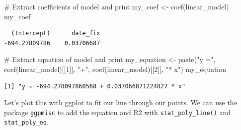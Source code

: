 \documentclass[
  letterpaper,
  DIV=11,
  numbers=noendperiod]{scrreprt}
\newenvironment{Shaded}{\begin{snugshade}}{\end{snugshade}}
\newcommand{\CommentTok}[1]{\textcolor[rgb]{0.37,0.37,0.37}{#1}}
\newcommand{\DecValTok}[1]{\textcolor[rgb]{0.68,0.00,0.00}{#1}}
\newcommand{\FunctionTok}[1]{\textcolor[rgb]{0.28,0.35,0.67}{#1}}
\newcommand{\NormalTok}[1]{\textcolor[rgb]{0.00,0.23,0.31}{#1}}
\newcommand{\OtherTok}[1]{\textcolor[rgb]{0.00,0.23,0.31}{#1}}
\newcommand{\StringTok}[1]{\textcolor[rgb]{0.13,0.47,0.30}{#1}}
\begin{document}
\begin{Shaded}
\begin{Highlighting}[]
\CommentTok{\# Extract coefficients of model and print}
\NormalTok{my\_coef }\OtherTok{\textless{}{-}} \FunctionTok{coef}\NormalTok{(linear\_model)            }
\NormalTok{my\_coef                            }
\end{Highlighting}
\end{Shaded}

\begin{verbatim}
  (Intercept)      date_fix 
-694.27809786    0.03706687 
\end{verbatim}

\begin{Shaded}
\begin{Highlighting}[]
\CommentTok{\# Extract equation of model and print}
\NormalTok{my\_equation }\OtherTok{\textless{}{-}} \FunctionTok{paste}\NormalTok{(}\StringTok{"y ="}\NormalTok{,        }
                     \FunctionTok{coef}\NormalTok{(linear\_model)[[}\DecValTok{1}\NormalTok{]],}
                     \StringTok{"+"}\NormalTok{,}
                     \FunctionTok{coef}\NormalTok{(linear\_model)[[}\DecValTok{2}\NormalTok{]],}
                     \StringTok{"* x"}\NormalTok{)}
\NormalTok{my\_equation                        }
\end{Highlighting}
\end{Shaded}

\begin{verbatim}
[1] "y = -694.278097860568 + 0.037066871224827 * x"
\end{verbatim}

Let's plot this with ggplot to fit our line through our points. We can
use the package \texttt{ggpmisc} to add the equation and R2 with
\texttt{stat\_poly\_line()} and \texttt{stat\_poly\_eq}.
\end{document}
